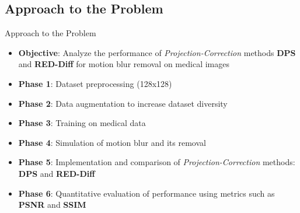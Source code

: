 \subsection{Approach to the Problem}
\begin{frame}{Approach to the Problem}
  \begin{itemize}
    \item \textbf{Objective}: Analyze the performance of \textit{Projection-Correction} methods \textbf{DPS} and \textbf{RED-Diff} for motion blur removal on medical images
    \item \textbf{Phase 1}: Dataset preprocessing (128x128)
    \item \textbf{Phase 2}: Data augmentation to increase dataset diversity
    \item \textbf{Phase 3}: Training on medical data
    \item \textbf{Phase 4}: Simulation of motion blur and its removal
    \item \textbf{Phase 5}: Implementation and comparison of \textit{Projection-Correction} methods: \textbf{DPS} and \textbf{RED-Diff}
    \item \textbf{Phase 6}: Quantitative evaluation of performance using metrics such as \textbf{PSNR} and \textbf{SSIM}
  \end{itemize}
\end{frame}